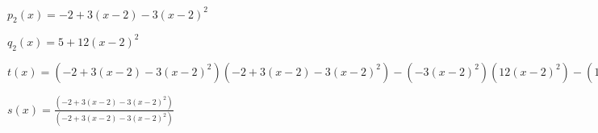 \documentclass[../practica_05.tex]{subfiles}
\begin{document}
    $ p_2(x) = -2 + 3(x-2) - 3(x-2)^2 $

    $ q_2(x) = 5 + 12(x-2)^2 $

    $t(x) = (-2 + 3(x-2) - 3(x-2)^2)(-2 + 3(x-2) - 3(x-2)^2) - (-3(x-2)^2)(12(x-2)^2) - (12(x-2)^2)(3(x-2)) $

    $s(x) = \frac{(-2 + 3(x-2) - 3(x-2)^2)}{(-2 + 3(x-2) - 3(x-2)^2)}$
\end{document}
